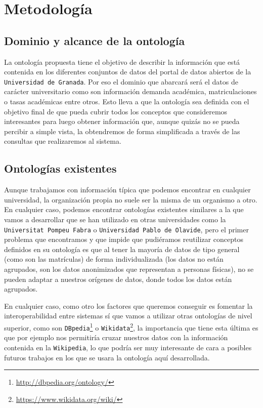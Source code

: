 \chapter{Metodología}

\section{Dominio y alcance de la ontología}

La ontología propuesta tiene el objetivo de describir la información que está contenida en los diferentes conjuntos de datos del portal de datos abiertos de la {\tt Universidad de Granada}. Por eso el dominio que abarcará será el datos de carácter universitario como son información demanda académica, matriculaciones o tasas académicas entre otros.
\bigskip
Esto lleva a que la ontología sea definida con el objetivo final de que pueda cubrir todos los conceptos que consideremos interesantes para luego obtener información que, aunque quizás no se pueda percibir a simple vista, la obtendremos de forma simplificada a través de las consultas que realizaremos al sistema.

\section{Ontologías existentes}

Aunque trabajamos con información típica que podemos encontrar en cualquier universidad, la organización propia no suele ser la misma de un organismo a otro. En cualquier caso, podemos encontrar ontologías existentes similares a la que vamos a desarrollar que se han utilizado en otras universidades como la {\tt Universitat Pompeu Fabra} o {\tt Universidad Pablo de Olavide}, pero el primer problema que encontramos y que impide que pudiéramos reutilizar conceptos definidos en su ontología es que al tener la mayoría de datos de tipo general (como son las matrículas) de forma individualizada (los datos no están agrupados, son los datos anonimizados que representan a personas físicas), no se pueden adaptar a nuestros orígenes de datos, donde todos los datos están agrupados.

\newpage
En cualquier caso, como otro los factores que queremos conseguir es fomentar la interoperabilidad entre sistemas sí que vamos a utilizar otras ontologías de nivel superior, como son {\tt DBpedia}\footnote{\url{http://dbpedia.org/ontology/}} o  {\tt Wikidata}\footnote{\url{https://www.wikidata.org/wiki/}}, la importancia que tiene esta última es que por ejemplo nos permitiría cruzar nuestros datos con la información contenida en la {\tt Wikipedia}, lo que podría ser muy interesante de cara a posibles futuros trabajos en los que se usara la ontología aquí desarrollada.


